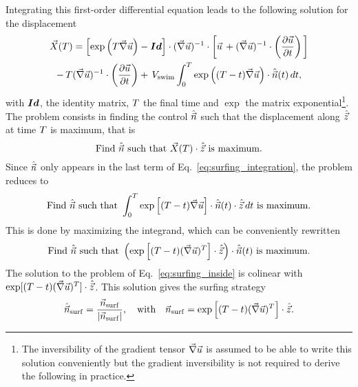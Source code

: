 Integrating this first-order differential equation leads to the following solution for the displacement
\begin{multline}
	\label{eq:surfing_integration}
	\vec{X}(T) =
	\left[ \exp \left( T \vec{\nabla} \vec{u} \right) - \boldsymbol{Id} \right] \cdot (\vec{\nabla} \vec{u})^{-1} \cdot \left[ \vec{u} \, + (\vec{\nabla} \vec{u})^{-1} \cdot \left(\frac{\partial \vec{u}}{\partial t} \right) \, \right] \\
	- \, T (\vec{\nabla} \vec{u})^{-1} \cdot \left(\frac{\partial \vec{u}}{\partial t} \right)
	+ \, V_{\mathrm{swim}} \int_{0}^{T} \exp \left( (T - t) \vec{\nabla} \vec{u} \right) \cdot\hat{\vec{n}}(t) \, dt ,
\end{multline}
with $\boldsymbol{Id}$, the identity matrix, $T$ the final time and $\exp$ the matrix exponential\footnote{The inversibility of the gradient tensor $\vec{\nabla} \vec{u}$ is assumed to be able to write this solution conveniently but the gradient inversibility is not required to derive the following in practice.}.
The problem consists in finding the control $\hat{\vec{n}}$ such that the displacement along $\hat{\vec{z}}$ at time $T$ is maximum, that is
\begin{equation}
	\text{Find} ~ \hat{\vec{n}} ~ \text{such that} ~ \vec{X}(T) \cdot \hat{\vec{z}} ~ \text{is maximum}.
\end{equation}
Since $\hat{\vec{n}}$ only appears in the last term of Eq.~\eqref{eq:surfing_integration}, the problem reduces to
\begin{equation}
	\text{Find} ~ \hat{\vec{n}} ~ \text{such that} ~ \int_{0}^{T} \exp \left[ (T - t) \vec{\nabla} \vec{u} \right] \cdot\hat{\vec{n}}(t) \cdot \hat{\vec{z}} \, dt ~ \text{is maximum}.
\end{equation}
This is done by maximizing the integrand, which can be conveniently rewritten
\begin{equation}
	\label{eq:surfing_inside}
	\text{Find} ~ \hat{\vec{n}} ~ \text{such that} ~ \left( \exp \left[ (T - t) (\vec{\nabla} \vec{u})^T \right] \cdot\hat{\vec{z}} \right) \cdot \hat{\vec{n}}(t) ~ \text{is maximum}.
\end{equation}
The solution to the problem of Eq.~\eqref{eq:surfing_inside} is colinear with $\exp [ (T - t) (\vec{\nabla} \vec{u})^T ] \cdot \hat{\vec{z}}$. 
This solution gives the surfing strategy
\begin{equation}
	\label{eq:surfing_optimal_swimming_direction}
	\hat{\vec{n}}_{\mathrm{surf}} = \frac{\vec{n}_{\mathrm{surf}}}{\lvert\vec{n}_{\mathrm{surf}}\rvert}, \quad \text{with} \quad \vec{n}_{\mathrm{surf}} = \exp \left[ (T - t) (\vec{\nabla} \vec{u})^T \right] \cdot \hat{\vec{z}}.
\end{equation}
